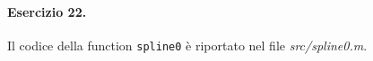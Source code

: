 \paragraph{Esercizio 22.} Il codice della function \verb|spline0| è riportato nel file \emph{src/spline0.m}.